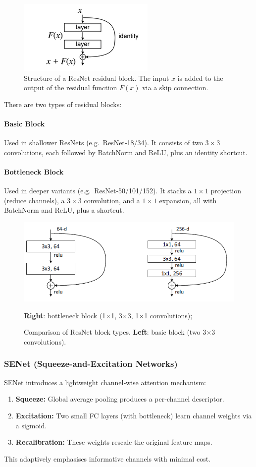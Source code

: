 \documentclass{article}
\begin{document}
\begin{figure}[ht]
    \centering
    \includegraphics[width=0.35\linewidth]{graphics/S5CNN/ResBlock.png}
    \caption{Structure of a ResNet residual block. The input $x$ is added to the output of the residual function $F(x)$ via a skip connection.}
    \label{fig:resnet-resblock}
\end{figure}

There are two types of residual blocks:

\paragraph{Basic Block}
Used in shallower ResNets (e.g.\ ResNet‑18/34). It consists of two $3\times3$ convolutions, each followed by BatchNorm and ReLU, plus an identity shortcut.

\paragraph{Bottleneck Block}
Used in deeper variants (e.g.\ ResNet‑50/101/152). It stacks a $1\times1$ projection (reduce channels), a $3\times3$ convolution, and a $1\times1$ expansion, all with BatchNorm and ReLU, plus a shortcut.

\begin{figure}[ht]
    \centering
    \includegraphics[width=0.65\linewidth]{graphics/S5CNN/res_blocks_type.png}
    \caption{Comparison of ResNet block types. 
    \textbf{Left}: basic block (two 3×3 convolutions).}
    \label{fig:resnet-block-types}
    \textbf{Right}: bottleneck block (1×1, 3×3, 1×1 convolutions);
\end{figure}

\subsubsection{SENet (Squeeze-and-Excitation Networks)}
SENet introduces a lightweight channel‑wise attention mechanism:
\begin{enumerate}
    \item \textbf{Squeeze:} Global average pooling produces a per‑channel descriptor.
    \item \textbf{Excitation:} Two small FC layers (with bottleneck) learn channel weights via a sigmoid.
    \item \textbf{Recalibration:} These weights rescale the original feature maps.
\end{enumerate}
This adaptively emphasises informative channels with minimal cost.
\end{document}

